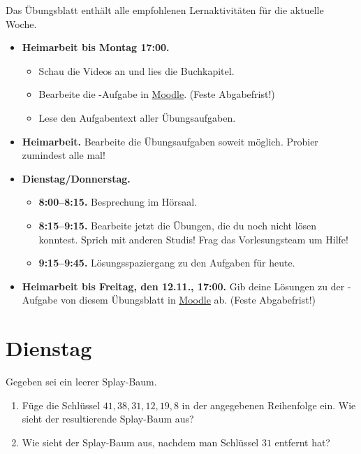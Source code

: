 \documentclass{uebung_cs}
\begin{document}
Das Übungsblatt enthält alle empfohlenen Lernaktivitäten für die aktuelle Woche.

\begin{itemize}
\item \textbf{Heimarbeit bis Montag 17:00.}
    \begin{itemize}
    \item 
    Schau die Videos an und lies die Buchkapitel.
    \item Bearbeite die -Aufgabe in \href{https://moodle.studiumdigitale.uni-frankfurt.de/moodle/course/view.php?id=2241}{Moodle}. (Feste Abgabefrist!)
    \item Lese den Aufgabentext aller Übungsaufgaben.
    \end{itemize}
\item \textbf{Heimarbeit.} Bearbeite die Übungsaufgaben soweit möglich. Probier zumindest alle mal!
\item \textbf{Dienstag/Donnerstag.}
\begin{itemize}
    \item \textbf{8:00--8:15.} Besprechung im Hörsaal.
    \item \textbf{8:15--9:15.} Bearbeite jetzt die Übungen, die du noch nicht lösen konntest. Sprich mit anderen Studis! Frag das Vorlesungsteam um Hilfe!
    \item \textbf{9:15--9:45.} Lösungsspaziergang zu den Aufgaben für heute.
\end{itemize}

\item \textbf{Heimarbeit bis Freitag, den 12.11., 17:00.} Gib deine Lösungen zu der -Aufgabe von diesem Übungsblatt in \href{https://moodle.studiumdigitale.uni-frankfurt.de/moodle/course/view.php?id=2241}{Moodle} ab. (Feste Abgabefrist!)
\end{itemize}

\section*{Dienstag}

\begin{exercise}
	Gegeben sei ein leerer Splay-Baum.
	\begin{enumerate}
		\item Füge die Schlüssel $41,38,31,12,19,8$ in der angegebenen Reihenfolge ein. Wie sieht der resultierende Splay-Baum aus?
		\item Wie sieht der Splay-Baum aus, nachdem man Schlüssel $31$ entfernt hat?
	\end{enumerate}		
\end{exercise}
\end{document}
